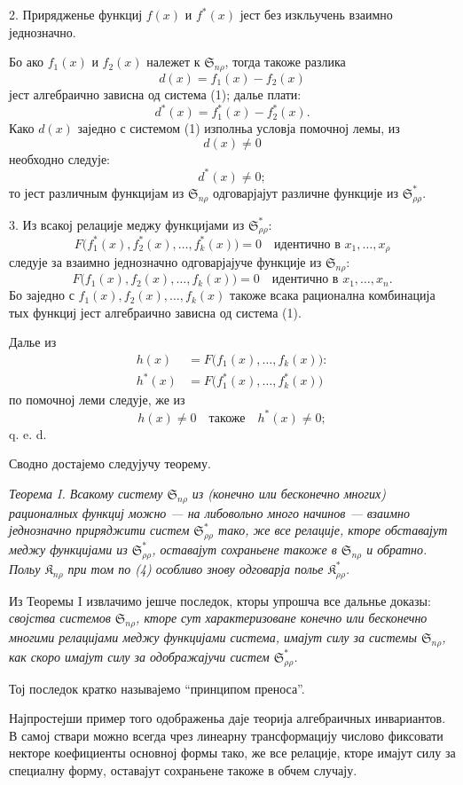 ﻿\documentclass[11pt]{article}
\providecommand{\Kfield}{\mathfrak{K}}
\providecommand{\Ssys}{\mathfrak{S}}
\begin{document}
2. Прирядженье функциј $f(x)$ и $f^*(x)$ јест без изкльучень взаимно једнозначно.

Бо ако $f_1(x)$ и $f_2(x)$ належет к $\Ssys_{n\rho}$, тогда такоже разлика
\[
  d(x)=f_1(x)-f_2(x)
\]
јест алгебраично зависна од система (1); далье плати:
\[
  d^*(x)=f_1^*(x)-f_2^*(x).
\]
Како $d(x)$ заједно с системом (1) изполньа условја помочној лемы, из
\[
  d(x)\ne0
\]
необходно следује:
\[
  d^*(x)\ne0;
\]
то јест различным функцијам из $\Ssys_{n\rho}$ одговарјајут различне функције из $\Ssys^*_{\rho\rho}$.

3. Из всакој релације меджу функцијами из $\Ssys^*_{\rho\rho}$:
\[
  F\bigl(f_1^*(x),f_2^*(x),\ldots,f_k^*(x)\bigr)=0
  \quad\text{идентично в }x_1,\ldots,x_\rho
\]
следује за взаимно једнозначно одговарјајуче функције из $\Ssys_{n\rho}$:
\[
  F\bigl(f_1(x),f_2(x),\ldots,f_k(x)\bigr)=0
  \quad\text{идентично в }x_1,
\ldots,x_n.
\]
Бо заједно с $f_1(x),f_2(x),\ldots,f_k(x)$ такоже всака рационална комбинација тых функциј јест алгебраично зависна од система (1).

Далье из
\begin{equation}
\begin{aligned}
 h(x)&=F\bigl(f_1(x),\ldots,f_k(x)\bigr):\\
 h^*(x)&=F\bigl(f_1^*(x),\ldots,f_k^*(x)\bigr)
\end{aligned}
\tag{4}
\end{equation}
по помочној леми следује, же из
\[
  h(x)\ne0\quad\text{такоже}\quad h^*(x)\ne0;
\]
q. e. d.

Сводно достајемо следујучу теорему.

{\itshape Теорема I. Всакому систему $\Ssys_{n\rho}$ из (конечно или бесконечно многих) рационалных функциј можно --- на либовольно много начинов --- взаимно једнозначно приряджити систем $\Ssys^*_{\rho\rho}$ тако, же все релације, кторе обставајут меджу функцијами из $\Ssys^*_{\rho\rho}$, оставајут сохраньене такоже в $\Ssys_{n\rho}$ и обратно. Польу $\Kfield_{n\rho}$ при том по (4) особливо знову одговарја полье $\Kfield^*_{\rho\rho}$.}

Из Теоремы I извлачимо јешче последок, кторы упрошча все дальнье доказы: {\itshape својства системов $\Ssys_{n\rho}$, кторе сут характеризоване конечно или бесконечно многими релацијами меджу функцијами система, имајут силу за системы $\Ssys_{n\rho}$, как скоро имајут силу за одображајучи систем $\Ssys^*_{\rho\rho}$.}

Тој последок кратко называјемо ``принципом преноса''.

\providecommand{\Lsys}{\mathfrak{L}}
\providecommand{\Jdom}{\mathfrak{J}}

\clearpage
Најпростејши пример того одображеньа даје теорија алгебраичных инвариантов. В самој ствари можно всегда чрез линеарну трансформацију числово фиксовати некторе коефициенты основној формы тако, же все релације, кторе имајут силу за специалну форму, оставајут сохраньене такоже в обчем случају.
\end{document}
